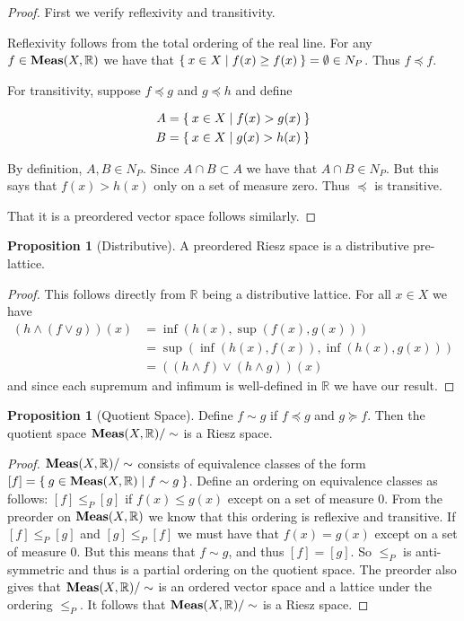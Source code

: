 \documentclass[letterpaper,10pt,oneside,onecolumn,reqno]{amsart}
\newcommand{\R}{\mathbb R}
\theoremstyle{definition}
\newtheorem{pro}[thm]{Proposition}
\newcommand{\catname}[1]{{\normalfont\textbf{#1}}}
\newcommand{\Meas}{\catname{Meas}}
\newcommand{\meet}{\wedge}
\newcommand{\join}{\vee}
\begin{document}
\begin{proof}
  First we verify reflexivity and transitivity.

  Reflexivity follows from the total ordering of the real line. For
  any $f \in \Meas(X, \R)$ we have that $\Set{x \in X | f(x) \geq
    f(x)} = \emptyset \in N_P$. Thus $f \preceq f$.

  For transitivity, suppose $f \preceq g$ and $g \preceq h$ and define

\begin{align*}
  A &= \Set{x \in X | f(x) > g(x)} \\
  B &= \Set{x \in X | g(x) > h(x)}
\end{align*}

By definition, $A,B \in N_P$. Since $A \cap B \subset A$ we have that
$A \cap B \in N_P$. But this says that $f(x) > h(x)$ only on a set of
measure zero. Thus $\preceq $ is transitive.

That it is a preordered vector space follows similarly.

\end{proof}

\begin{pro}[Distributive]\label{pro:2}
  A preordered Riesz space is a distributive pre-lattice.
\end{pro}

\begin{proof}
  This follows directly from $\R$ being a distributive lattice. For
  all $x \in X$ we have
  \begin{align*}
    (h \meet (f \join g))(x) &= \inf(h(x), \sup(f(x),g(x))) \\
    &= \sup(\inf(h(x),f(x)),\inf(h(x),g(x))) \\
    &= ((h \meet f) \join (h \meet g))(x)
  \end{align*}
  and since each supremum and infimum is well-defined in $\R$ we have
  our result.
\end{proof}

\begin{pro}[Quotient Space]\label{pro:3}
  Define $f \sim g$ if $f \preceq g$ and $g \succeq f$. Then the
  quotient space $\Meas(X,\R)/\sim$ is a Riesz space.
\end{pro}

\begin{proof}
  $\Meas(X, \R)/\sim$ consists of equivalence classes of the form $[f]
  = \Set{g \in \Meas(X, \R) | f \sim g }$. Define an ordering on
  equivalence classes as follows: $[f] \leq_P [g]$ if $f(x) \leq g(x)$
  except on a set of measure $0$. From the preorder on $\Meas(X,\R)$
  we know that this ordering is reflexive and transitive.  If $[f]
  \leq_P [g]$ and $[g] \leq_P [f]$ we must have that $f(x) = g(x)$
  except on a set of measure $0$. But this means that $f \sim g$, and
  thus $[f] = [g]$. So $\leq_P$ is anti-symmetric and thus is a
  partial ordering on the quotient space. The preorder also gives that
  $\Meas(X,\R)/\sim$ is an ordered vector space and a lattice under
  the ordering $\leq_P$. It follows that $\Meas(X,\R)/\sim$ is a Riesz
  space.
\end{proof}
\end{document}
